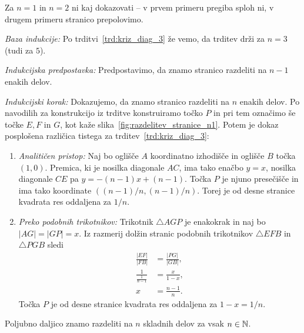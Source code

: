 \begin{dokaz}
    Za $n = 1$ in $n = 2$ ni kaj dokazovati -- v prvem primeru pregiba sploh ni, v drugem primeru stranico prepolovimo.

    \textit{Baza indukcije:} Po trditvi~\ref{trd:kriz_diag_3} že vemo, da trditev drži za $n = 3$ (tudi za $5$).

    \textit{Indukcijska predpostavka:} Predpostavimo, da znamo stranico razdeliti na $n-1$ enakih delov.

    \textit{Indukcijski korak:} Dokazujemo, da znamo stranico razdeliti na $n$ enakih delov. Po navodilih za konstrukcijo iz trditve konstruiramo točko $P$ in pri tem označimo še točke $E, F$ in $G$, kot kaže slika~\ref{fig:razdelitev_stranice_n1}. Potem je dokaz posplošena različica tistega za trditev~\ref{trd:kriz_diag_3}:
    \begin{enumerate}
        \item \textit{Analitičen pristop:} Naj bo oglišče $A$ koordinatno izhodišče in oglišče $B$ točka $(1, 0)$. Premica, ki je nosilka diagonale $AC$, ima tako enačbo $y = x$, nosilka diagonale $CE$ pa $y = -(n-1)x + (n-1)$. Točka $P$ je njuno presečišče in ima tako koordinate $((n-1)/n, (n-1)/n)$. Torej je od desne stranice kvadrata res oddaljena za $1/n$.
        \item \textit{Preko podobnih trikotnikov:} Trikotnik $\triangle AGP$ je enakokrak in naj bo $|AG| = |GP| = x$. Iz razmerij dolžin stranic podobnih trikotnikov $\triangle EFB$ in $\triangle PGB$ sledi
        \begin{align*}
            \frac{|EF|}{|FB|} &= \frac{|PG|}{|GB|}, \\
            \frac{1}{\frac{1}{n-1}} &= \frac{x}{1 - x}, \\
            x &= \frac{n-1}{n}.
        \end{align*}
        Točka $P$ je od desne stranice kvadrata res oddaljena za $1-x = 1/n$.
    \end{enumerate}
\end{dokaz}

\begin{posledica}
    Poljubno daljico znamo razdeliti na $n$ skladnih delov za vsak $n \in \mathbb N$.
\end{posledica}

